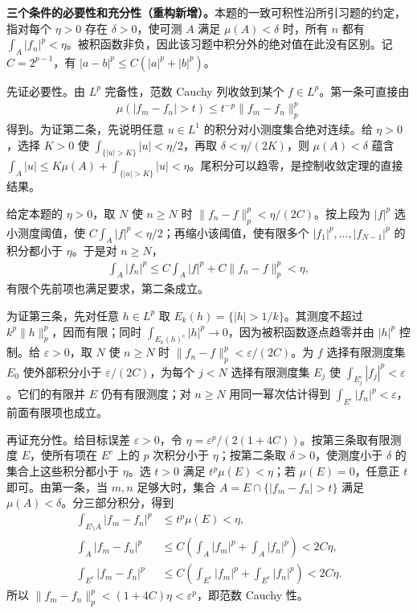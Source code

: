 \documentclass[../../main.tex]{subfiles}
\begin{document}
\begin{solution}
\textbf{三个条件的必要性和充分性（重构新增）。}本题的一致可积性沿所引习题的约定，指对每个 $\eta>0$ 存在 $\delta>0$，使可测 $A$ 满足 $\mu(A)<\delta$ 时，所有 $n$ 都有 $\int_A|f_n|^p<\eta$。被积函数非负，因此该习题中积分外的绝对值在此没有区别。记 $C=2^{p-1}$，有 $|a-b|^p\leqslant C(|a|^p+|b|^p)$。

先证必要性。由 $L^p$ 完备性，范数 Cauchy 列收敛到某个 $f\in L^p$。第一条可直接由
\begin{align*}
\mu(|f_m-f_n|>t)\leqslant t^{-p}\|f_m-f_n\|_p^p
\end{align*}
得到。为证第二条，先说明任意 $u\in L^1$ 的积分对小测度集合绝对连续。给 $\eta>0$，选择 $K>0$ 使 $\int_{\{|u|>K\}}|u|<\eta/2$，再取 $\delta<\eta/(2K)$，则 $\mu(A)<\delta$ 蕴含 $\int_A|u|\leqslant K\mu(A)+\int_{\{|u|>K\}}|u|<\eta$。尾积分可以趋零，是控制收敛定理的直接结果。

给定本题的 $\eta>0$，取 $N$ 使 $n\geqslant N$ 时 $\|f_n-f\|_p^p<\eta/(2C)$。按上段为 $|f|^p$ 选小测度阈值，使 $C\int_A|f|^p<\eta/2$；再缩小该阈值，使有限多个 $|f_1|^p,\ldots,|f_{N-1}|^p$ 的积分都小于 $\eta$。于是对 $n\geqslant N$，
\begin{align*}
\int_A|f_n|^p\leqslant C\int_A|f|^p+C\|f_n-f\|_p^p<\eta,
\end{align*}
有限个先前项也满足要求，第二条成立。

为证第三条，先对任意 $h\in L^p$ 取 $E_k(h)=\{|h|>1/k\}$。其测度不超过 $k^p\|h\|_p^p$，因而有限；同时 $\int_{E_k(h)^c}|h|^p\to0$，因为被积函数逐点趋零并由 $|h|^p$ 控制。给 $\varepsilon>0$，取 $N$ 使 $n\geqslant N$ 时 $\|f_n-f\|_p^p<\varepsilon/(2C)$。为 $f$ 选择有限测度集 $E_0$ 使外部积分小于 $\varepsilon/(2C)$，为每个 $j<N$ 选择有限测度集 $E_j$ 使 $\int_{E_j^c}|f_j|^p<\varepsilon$。它们的有限并 $E$ 仍有有限测度；对 $n\geqslant N$ 用同一幂次估计得到 $\int_{E^c}|f_n|^p<\varepsilon$，前面有限项也成立。

再证充分性。给目标误差 $\varepsilon>0$，令 $\eta=\varepsilon^p/(2(1+4C))$。按第三条取有限测度 $E$，使所有项在 $E^c$ 上的 $p$ 次积分小于 $\eta$；按第二条取 $\delta>0$，使测度小于 $\delta$ 的集合上这些积分都小于 $\eta$。选 $t>0$ 满足 $t^p\mu(E)<\eta$；若 $\mu(E)=0$，任意正 $t$ 即可。由第一条，当 $m,n$ 足够大时，集合 $A=E\cap\{|f_m-f_n|>t\}$ 满足 $\mu(A)<\delta$。分三部分积分，得到
\begin{align*}
\int_{E\setminus A}|f_m-f_n|^p&\leqslant t^p\mu(E)<\eta,\\
\int_A|f_m-f_n|^p&\leqslant C\left(\int_A|f_m|^p+\int_A|f_n|^p\right)<2C\eta,\\
\int_{E^c}|f_m-f_n|^p&\leqslant C\left(\int_{E^c}|f_m|^p+\int_{E^c}|f_n|^p\right)<2C\eta.
\end{align*}
所以 $\|f_m-f_n\|_p^p<(1+4C)\eta<\varepsilon^p$，即范数 Cauchy 性。
\end{solution}
\end{document}
